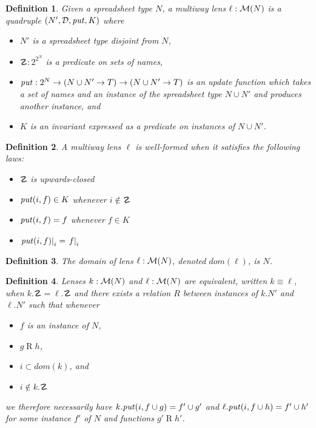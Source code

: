 \documentclass{article}
\newtheorem{definition}{Definition}
\begin{document}
\begin{definition}
    Given a spreadsheet type $N$, a \emph{multiway lens} $\ell : \mathcal M(N)$
    is a quadruple $(N',\mathcal D,\mathit{put},K)$ where
    \begin{itemize}
        \item $N'$ is a spreadsheet type disjoint from $N$,
        \item $\danger : 2^{2^N}$ is a predicate on sets of names,
        \item $\mathit{put} : 2^N \to (N \cup N' \to T) \to (N \cup N' \to T)$ is
            an update function which takes a set of names and an instance of
            the spreadsheet type $N \cup N'$ and produces another instance,
            and
        \item $K$ is an invariant expressed as a predicate on instances of
            $N \cup N'$.
    \end{itemize}
\end{definition}

\begin{definition}
    A multiway lens $\ell$ is \emph{well-formed} when it satisfies the
    following laws:
    \begin{itemize}
        \item $\danger$ is upwards-closed
        \item $\mathit{put}(i,f) \in K$ whenever $i \notin \danger$
        \item $\mathit{put}(i,f) = f$ whenever $f \in K$
        \item $\left.\mathit{put}(i,f)\right|_i = \left.f\right|_i$
    \end{itemize}
\end{definition}

\newcommand{\mdomain}[1]{\mathit{dom}(#1)}
\begin{definition}
    The \emph{domain} of lens $\ell : \mathcal M(N)$, denoted $\mdomain\ell$, is
    $N$.
\end{definition}

\begin{definition}
    Lenses $k : \mathcal M(N)$ and $\ell : \mathcal M(N)$ are \emph{equivalent},
    written $k \equiv \ell$, when $k.\danger = \ell.\danger$ and there
    exists a relation $R$ between instances of $k.N'$ and $\ell.N'$ such
    that whenever
    \begin{itemize}
        \item $f$ is an instance of $N$,
        \item $g\mathrel Rh$,
        \item $i \subset \mdomain k$, and
        \item $i \notin k.\danger$
    \end{itemize}
    we therefore necessarily have $k.\mathit{put}(i,f \cup g)=f' \cup g'$ and
    $\ell.\mathit{put}(i,f \cup h)=f' \cup h'$ for some instance $f'$ of $N$ and
    functions $g'\mathrel Rh'$.
\end{definition}
\end{document}
